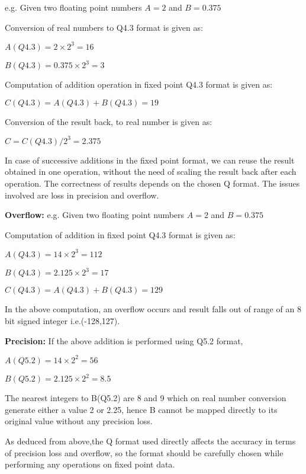 \vspace{0.25cm}
\noindent e.g. Given two floating point numbers $A=2$ and $B=0.375$

\noindent Conversion of real numbers to Q4.3 format is given as:

\noindent $A(Q4.3)=2\times 2^{3} = 16$

\noindent $B(Q4.3)=0.375\times 2^{3}=3$

\noindent Computation of addition operation in fixed point Q4.3 format is given as:

\noindent $C(Q4.3)= A(Q4.3)+B(Q4.3)= 19$

\noindent Conversion of the result back, to real number is given as:

\noindent $C=C(Q4.3)/2^{3}=2.375$

\vspace{0.25cm}
\noindent In case of successive additions in the fixed point format, we can reuse the result obtained in one operation, without the need of scaling the result back after each operation. The correctness of results depends on the chosen Q format. The issues involved are loss in precision and overflow.

\vspace{.25cm}
\noindent \textbf{Overflow:} e.g. Given two floating point numbers $A=2$ and $B=0.375$

\noindent Computation of addition in fixed point Q4.3 format is given as:

\noindent $A(Q4.3)=14\times 2^{3}= 112$

\noindent $B(Q4.3)= 2.125\times 2^{3}= 17$

\noindent $C(Q4.3)= A(Q4.3)+B(Q4.3)= 129$

\noindent In the above computation, an overflow occurs and result falls out of range of an 8 bit signed integer i.e.(-128,127).

\vspace{.25cm}
\noindent \textbf{Precision:} If the above addition is performed using Q5.2 format,

\noindent $A(Q5.2)=14\times 2^{2}= 56 $

\noindent $B(Q5.2)= 2.125\times 2^{2}= 8.5$

\noindent The nearest integers to B(Q5.2) are 8 and 9 which on real number conversion generate either a value 2 or 2.25, hence B cannot be mapped directly to its original value without any precision loss.

\vspace{.25cm}
\noindent As deduced from above,the Q format used directly affects the accuracy in terms of precision loss and overflow, so the format should be carefully chosen while performing any operations on fixed point data.

